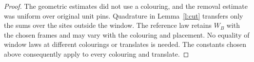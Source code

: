 \begin{proof}
The geometric estimates did not use a colouring, and the
removal estimate was uniform over original unit pins.
Quadrature in Lemma~\ref{l:cut} transfers only the sums over
the sites outside the window.  The reference law retains
\(W_B\) with the chosen frames and may vary with the colouring
and placement.  No equality of window laws at different
colourings or translates is needed.  The constants chosen
above consequently apply to every colouring and translate.
\end{proof}
